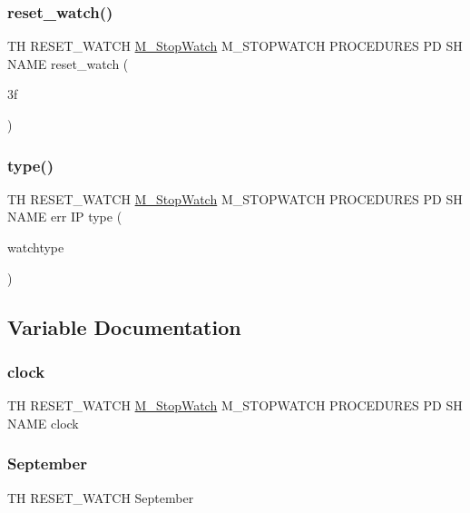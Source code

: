 \subsubsection{\texorpdfstring{reset\+\_\+watch()}{reset\_watch()}}
{\footnotesize\ttfamily TH R\+E\+S\+E\+T\+\_\+\+W\+A\+T\+CH \hyperlink{option__stopwatch_83_8txt_aa2011fc45a5e502e87ee50996a8a9305}{M\+\_\+\+Stop\+Watch} M\+\_\+\+S\+T\+O\+P\+W\+A\+T\+CH P\+R\+O\+C\+E\+D\+U\+R\+ES PD SH N\+A\+ME reset\+\_\+watch (\begin{DoxyParamCaption}\item[{3f}]{ }\end{DoxyParamCaption})}

\mbox{\label{reset__watch_83_8txt_a69ae41268dbeb10a64f113e549021710}} 
\subsubsection{\texorpdfstring{type()}{type()}}
{\footnotesize\ttfamily TH R\+E\+S\+E\+T\+\_\+\+W\+A\+T\+CH \hyperlink{option__stopwatch_83_8txt_aa2011fc45a5e502e87ee50996a8a9305}{M\+\_\+\+Stop\+Watch} M\+\_\+\+S\+T\+O\+P\+W\+A\+T\+CH P\+R\+O\+C\+E\+D\+U\+R\+ES PD SH N\+A\+ME err IP type (\begin{DoxyParamCaption}\item[{watchtype}]{ }\end{DoxyParamCaption})}



\subsection{Variable Documentation}
\mbox{\label{reset__watch_83_8txt_a6edaf77670f85062a402406bd5a409b1}} 
\subsubsection{\texorpdfstring{clock}{clock}}
{\footnotesize\ttfamily TH R\+E\+S\+E\+T\+\_\+\+W\+A\+T\+CH \hyperlink{option__stopwatch_83_8txt_aa2011fc45a5e502e87ee50996a8a9305}{M\+\_\+\+Stop\+Watch} M\+\_\+\+S\+T\+O\+P\+W\+A\+T\+CH P\+R\+O\+C\+E\+D\+U\+R\+ES PD SH N\+A\+ME clock}

\mbox{\label{reset__watch_83_8txt_a75ad10929d982abab45eddd5a9ee9490}} 
\subsubsection{\texorpdfstring{September}{September}}
{\footnotesize\ttfamily TH R\+E\+S\+E\+T\+\_\+\+W\+A\+T\+CH September}

